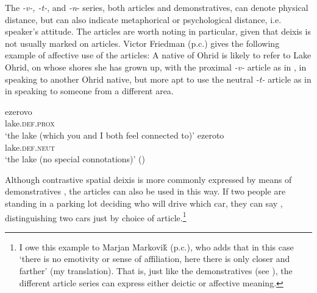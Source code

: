 \documentclass[output=paper,
colorlinks,
citecolor=brown,
newtxmath
]{langscibook}
\begin{document}
The  \textit{-v-, -t-}, and \textit{-n}- series, both articles and demonstratives, can denote physical distance, but can also indicate metaphorical or psychological distance, i.e. speaker's attitude. The articles are worth noting in particular, given that deixis is not usually marked on articles. Victor Friedman (p.c.) gives the following example of affective use of the articles: A native of Ohrid is likely to refer to Lake Ohrid, on whose shores she has grown up, with the proximal \textit{-v-} article as in , in speaking to another Ohrid native, but more apt to use the neutral \textit{-t-} article as in  in speaking to someone from a different area.

\ea\label{lake}
\ea\label{lake1}
\gll ezerovo \\
     lake.\textsc{def.prox} \\
\glt `the lake (which you and I both feel connected to)'
\ex \label{lake2}
\gll ezeroto \\
     lake.\textsc{def}.\textsc{neut} \\
\glt `the lake (no special connotations)' \hfill ()
\z\z

\noindent Although contrastive spatial deixis is more commonly expressed by means of demonstratives \citep{Karapejovski2017}, the articles can also be used in this way. If two people are standing in a parking lot deciding who will drive which car, they can say , distinguishing two cars just by choice of article.\footnote{I owe this example to Marjan Markoviḱ (p.c.), who adds that in this case `there is no emotivity or sense of affiliation, here there is only closer and farther' (my translation). That is, just like the demonstratives (see ), the different article series can express either deictic or affective meaning.}
\end{document}
